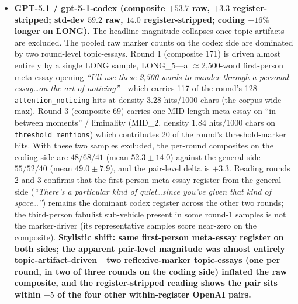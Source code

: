 \documentclass[11pt,a4paper]{article}
\begin{document}
\begin{sloppypar}
\begin{itemize}[leftmargin=2em, itemsep=0.3em, topsep=0.3em]
\item \textbf{GPT-5.1 / gpt-5-1-codex (composite $+53.7$ raw, $+3.3$ register-stripped; std-dev $59.2$ raw, $14.0$ register-stripped; coding $+16\%$ longer on LONG).} The headline magnitude collapses once topic-artifacts are excluded. The pooled raw marker counts on the codex side are dominated by two round-level topic-essays. Round 1 (composite 171) is driven almost entirely by a single LONG sample, LONG\_5---a $\approx$2{,}500-word first-person meta-essay opening \emph{``I'll use these 2,500 words to wander through a personal essay\ldots on the art of noticing''}---which carries 117 of the round's 128 \texttt{attention\allowbreak\_noticing} hits at density 3.28 hits/1000 chars (the corpus-wide max). Round 3 (composite 69) carries one MID-length meta-essay on ``in-between moments'' / liminality (MID\_2, density 1.84 hits/1000 chars on \texttt{threshold\_mentions}) which contributes 20 of the round's threshold-marker hits. With these two samples excluded, the per-round composites on the coding side are $48 / 68 / 41$ (mean $52.3 \pm 14.0$) against the general-side $55 / 52 / 40$ (mean $49.0 \pm 7.9$), and the pair-level delta is $+3.3$. Reading rounds 2 and 3 confirms that the first-person meta-essay register from the general side (\emph{``There's a particular kind of quiet\ldots since you've given that kind of space\ldots''}) remains the dominant codex register across the other two rounds; the third-person fabulist sub-vehicle present in some round-1 samples is not the marker-driver (its representative samples score near-zero on the composite). \textbf{Stylistic shift: same first-person meta-essay register on both sides; the apparent pair-level magnitude was almost entirely topic-artifact-driven---two reflexive-marker topic-essays (one per round, in two of three rounds on the coding side) inflated the raw composite, and the register-stripped reading shows the pair sits within $\pm 5$ of the four other within-register OpenAI pairs.}


\end{itemize}
\end{sloppypar}
\end{document}
